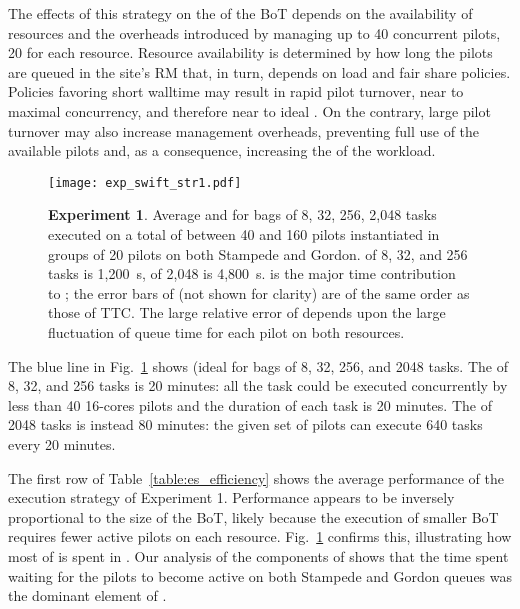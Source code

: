 \documentclass[10pt, conference, compsocconf]{IEEEtran}
\newcommand{\B}[1]{\textbf{#1}\xspace}
\begin{document}
The effects of this strategy on the  of the BoT depends on the
availability of resources and the overheads introduced by managing up to 40
concurrent pilots, 20 for each resource.  Resource availability is determined
by how long the pilots are queued in the site's RM that, in turn, depends on
load and fair share policies. Policies favoring short walltime may result in
rapid pilot turnover, near to maximal concurrency, and therefore near to
ideal . On the contrary, large pilot turnover may also increase
management overheads, preventing full use of the available pilots and, as a
consequence, increasing the  of the workload.

\begin{figure}
  \centering
  \texttt{[image: exp\_swift\_str1.pdf]}
  \caption{ \B{Experiment 1}. Average  and  for bags of 8, 32,
            256, 2,048 tasks executed on a total of between 40 and 160 pilots
            instantiated in groups of 20 pilots on both Stampede and Gordon.
             of 8, 32, and 256 tasks is 1,200~s, of 2,048 is
            4,800~s.
             is the major time contribution to ; the error bars
            of  (not shown for clarity) are of the same order as those
            of TTC\@. The large relative error of  depends upon the
            large fluctuation of queue time for each pilot on both
            resources.}\label{fig:exp_swift_1}
\end{figure}

The blue line in Fig.~\ref{fig:exp_swift_1} shows  (ideal 
for bags of 8, 32, 256, and 2048 tasks. The  of 8, 32, and 256 tasks
is 20 minutes: all the task could be executed concurrently by less than 40
16-cores pilots and the duration of each task is 20 minutes. The  of
2048 tasks is instead 80 minutes: the given set of pilots can execute 640
tasks every 20 minutes.

The first row of Table~\ref{table:es_efficiency} shows the average
performance  of the execution strategy of Experiment 1. Performance
appears to be inversely proportional to the size of the BoT, likely because
the execution of smaller BoT requires fewer active pilots on each resource.
Fig.~\ref{fig:exp_swift_1} confirms this, illustrating how most of  is
spent in . Our analysis of the components of  shows that the
time spent waiting for the pilots to become active on both Stampede and
Gordon queues was the dominant element of .
\end{document}
